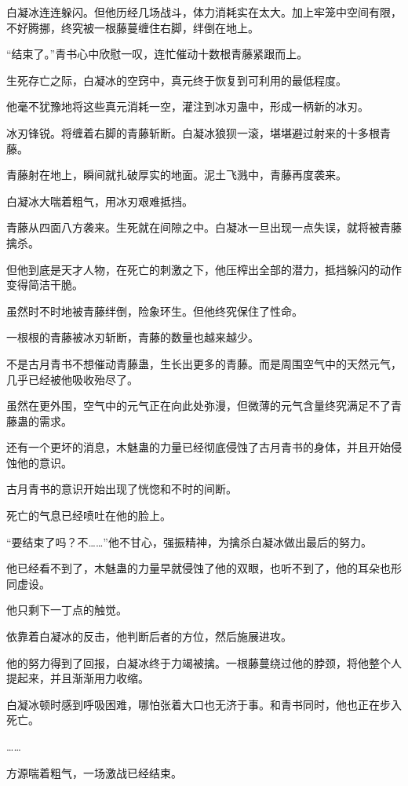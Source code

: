 \begin{this_body}
白凝冰连连躲闪。但他历经几场战斗，体力消耗实在太大。加上牢笼中空间有限，不好腾挪，终究被一根藤蔓缠住右脚，绊倒在地上。

“结束了。”青书心中欣慰一叹，连忙催动十数根青藤紧跟而上。

生死存亡之际，白凝冰的空窍中，真元终于恢复到可利用的最低程度。

他毫不犹豫地将这些真元消耗一空，灌注到冰刃蛊中，形成一柄新的冰刃。

冰刃锋锐。将缠着右脚的青藤斩断。白凝冰狼狈一滚，堪堪避过射来的十多根青藤。

青藤射在地上，瞬间就扎破厚实的地面。泥土飞溅中，青藤再度袭来。

白凝冰大喘着粗气，用冰刃艰难抵挡。

青藤从四面八方袭来。生死就在间隙之中。白凝冰一旦出现一点失误，就将被青藤擒杀。

但他到底是天才人物，在死亡的刺激之下，他压榨出全部的潜力，抵挡躲闪的动作变得简洁干脆。

虽然时不时地被青藤绊倒，险象环生。但他终究保住了性命。

一根根的青藤被冰刃斩断，青藤的数量也越来越少。

不是古月青书不想催动青藤蛊，生长出更多的青藤。而是周围空气中的天然元气，几乎已经被他吸收殆尽了。

虽然在更外围，空气中的元气正在向此处弥漫，但微薄的元气含量终究满足不了青藤蛊的需求。

还有一个更坏的消息，木魅蛊的力量已经彻底侵蚀了古月青书的身体，并且开始侵蚀他的意识。

古月青书的意识开始出现了恍惚和不时的间断。

死亡的气息已经喷吐在他的脸上。

“要结束了吗？不……”他不甘心，强振精神，为擒杀白凝冰做出最后的努力。

他已经看不到了，木魅蛊的力量早就侵蚀了他的双眼，也听不到了，他的耳朵也形同虚设。

他只剩下一丁点的触觉。

依靠着白凝冰的反击，他判断后者的方位，然后施展进攻。

他的努力得到了回报，白凝冰终于力竭被擒。一根藤蔓绕过他的脖颈，将他整个人提起来，并且渐渐用力收缩。

白凝冰顿时感到呼吸困难，哪怕张着大口也无济于事。和青书同时，他也正在步入死亡。

……

方源喘着粗气，一场激战已经结束。


\end{this_body}
